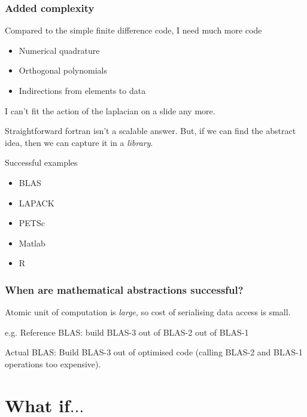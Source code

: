 \documentclass[presentation]{beamer}
\begin{document}
\begin{frame}
  \frametitle{Added complexity}
  Compared to the simple finite difference code, I need much more code

  \begin{itemize}
  \item Numerical quadrature
  \item Orthogonal polynomials
  \item Indirections from elements to data
  \end{itemize}

  I can't fit the action of the laplacian on a slide any more.

  
  Straightforward fortran isn't a scalable answer.  But, if we can
  find the abstract idea, then we can capture it in a \emph{library}.

  Successful examples

  \begin{itemize}
  \item BLAS
  \item LAPACK
  \item PETSc
  \item Matlab
  \item R
  \end{itemize}
\end{frame}

\begin{frame}
  \frametitle{When are mathematical abstractions successful?}

  Atomic unit of computation is \emph{large}, so cost of serialising
  data access is small.

  e.g. Reference BLAS: build BLAS-3 out of BLAS-2 out of BLAS-1

  Actual BLAS: Build BLAS-3 out of optimised code (calling BLAS-2 and
  BLAS-1 operations too expensive).
\end{frame}

\section{What if$\dots$}
\end{document}
